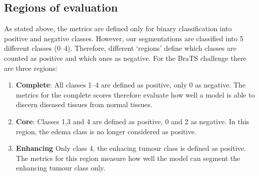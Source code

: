\documentclass[12pt,a4paper,twoside,openright]{report}
\begin{document}
\subsection{Regions of evaluation}
As stated above, the metrics are defined only for binary classification into positive and negative classes. However, our segmentations are classified into 5 different classes (0--4). Therefore, different `regions' define which classes are counted as positive and which ones as negative. For the BraTS challenge there are three regions:
\begin{enumerate}
	\item \textbf{Complete}: All classes 1--4 are defined as positive, only 0 as negative. The metrics for the complete scores therefore evaluate how well a model is able to discern diseased tissues from normal tissues.
	\item \textbf{Core}: Classes 1,3 and 4 are defined as positive, 0 and 2 as negative. In this region, the edema class is no longer considered as positive.
	\item \textbf{Enhancing} Only class 4, the enhacing tumour class is defined as positive. The metrics for this region measure how well the model can segment the enhancing tumour class only.
\end{enumerate}
\end{document}
